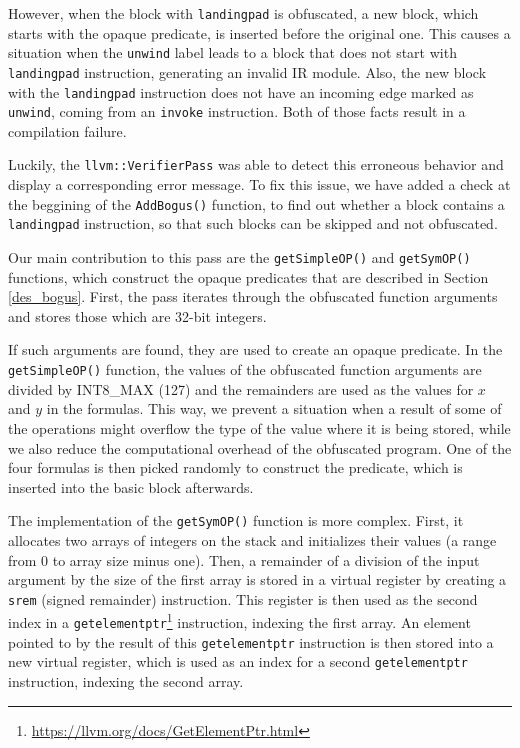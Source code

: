 \documentclass[
  digital, %
  notable,   %
  twoside, %
  nolof,     %
  nolot,     %
]{fithesis3}
\theoremstyle{definition}
\begin{document}
However, when the block with \texttt{landingpad} is obfuscated, a new block, which starts with the opaque predicate, is inserted before the original one. This causes a situation when the \texttt{unwind} label leads to a block that does not start with \texttt{landingpad} instruction, generating an invalid IR module. Also, the new block with the \texttt{landingpad} instruction does not have an incoming edge marked as \texttt{unwind}, coming from an \texttt{invoke} instruction. Both of those facts result in a compilation failure.

Luckily, the \texttt{llvm::VerifierPass} was able to detect this erroneous behavior and display a corresponding error message. To fix this issue, we have added a check at the beggining of the \texttt{AddBogus()} function, to find out whether a block contains a \texttt{landingpad} instruction, so that such blocks can be skipped and not obfuscated. 

Our main contribution to this pass are the \texttt{getSimpleOP()} and \texttt{getSymOP()} functions, which construct the opaque predicates that are described in Section \ref{des_bogus}. First, the pass iterates through the obfuscated function arguments and stores those which are 32-bit integers. 

If such arguments are found, they are used to create an opaque predicate. In the \texttt{getSimpleOP()} function, the values of the obfuscated function arguments are divided by INT8\_MAX (127) and the remainders are used as the values for $x$ and $y$ in the formulas. This way, we prevent a situation when a result of some of the operations might overflow the type of the value where it is being stored, while we also reduce the computational overhead of the obfuscated program. One of the four formulas is then picked randomly to construct the predicate, which is inserted into the basic block afterwards. 

The implementation of the \texttt{getSymOP()} function is more complex. First, it allocates two arrays of integers on the stack and initializes their values (a range from 0 to array size minus one). Then, a remainder of a division of the input argument by the size of the first array is stored in a virtual register by creating a \texttt{srem} (signed remainder) instruction. This register is then used as the second index in a \texttt{getelementptr}\footnote{\url{https://llvm.org/docs/GetElementPtr.html}} instruction, indexing the first array. An element pointed to by the result of this \texttt{getelementptr} instruction is then stored into a new virtual register, which is used as an index for a second \texttt{getelementptr} instruction, indexing the second array. 
\end{document}
